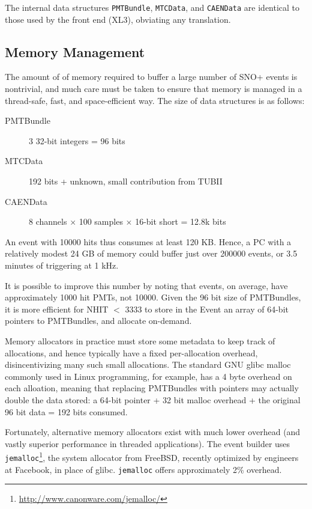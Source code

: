 \documentclass[11pt,twocolumn]{article}
\begin{document}
The internal data structures {\tt PMTBundle}, {\tt MTCData}, and {\tt CAENData} are identical to those used by the front end (XL3), obviating any translation.

\subsection{Memory Management}
The amount of of memory required to buffer a large number of SNO+ events is nontrivial, and much care must be taken to ensure that memory is managed in a thread-safe, fast, and space-efficient way. The size of data structures is as follows:
\begin{description}
\item[PMTBundle] 3 32-bit integers = 96 bits
\item[MTCData] 192 bits + unknown, small contribution from TUBII
\item[CAENData] 8 channels $\times$ 100 samples $\times$ 16-bit short = 12.8k bits
\end{description}
An event with 10000 hits thus consumes at least 120 KB. Hence, a PC with a relatively modest 24 GB of memory could buffer just over 200000 events, or 3.5 minutes of triggering at 1 kHz.

It is possible to improve this number by noting that events, on average, have approximately 1000 hit PMTs, not 10000. Given the 96 bit size of PMTBundles, it is more efficient for NHIT $<$ 3333 to store in the Event an array of 64-bit pointers to PMTBundles, and allocate on-demand.

Memory allocators in practice must store some metadata to keep track of allocations, and hence typically have a fixed per-allocation overhead, disincentivizing many such small allocations. The standard GNU glibc malloc commonly used in Linux programming, for example, has a 4 byte overhead on each alloation, meaning that replacing PMTBundles with pointers may actually double the data stored: a 64-bit pointer + 32 bit malloc overhead + the original 96 bit data = 192 bits consumed.

Fortunately, alternative memory allocators exist with much lower overhead (and vastly superior performance in threaded applications). The event builder uses {\tt jemalloc}\footnote{\href{http://www.canonware.com/jemalloc/}{http://www.canonware.com/jemalloc/}}, the system allocator from FreeBSD, recently optimized by engineers at Facebook, in place of glibc. {\tt jemalloc} offers approximately 2\% overhead.
\end{document}
